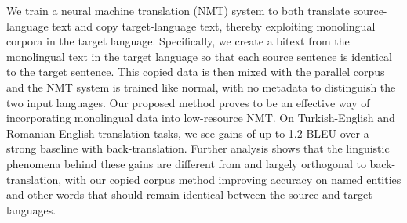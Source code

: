 We train a neural machine translation (NMT) system to both translate source-language text and copy target-language text, thereby exploiting monolingual corpora in the target language. Specifically, we create a bitext from the monolingual text in the target language so that each source sentence is identical to the target sentence. This copied data is then mixed with the parallel corpus and the NMT system is trained like normal, with no metadata to distinguish the two input languages. Our proposed method proves to be an effective way of incorporating monolingual data into low-resource NMT. On Turkish-English and Romanian-English translation tasks, we see gains of up to 1.2 BLEU over a strong baseline with back-translation. Further analysis shows that the linguistic phenomena behind these gains are different from and largely orthogonal to back-translation, with our copied corpus method improving accuracy on named entities and other words that should remain identical between the source and target languages.
